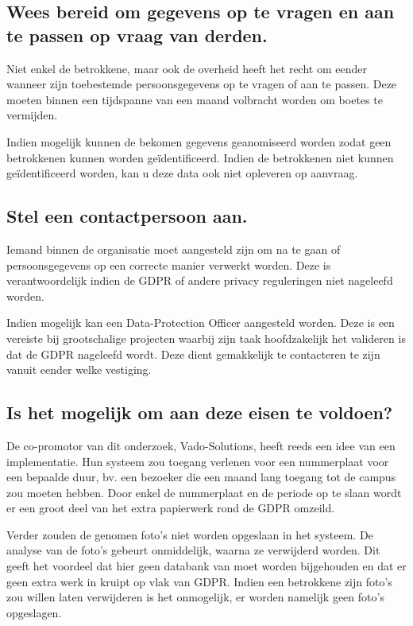 \subsection{Wees bereid om gegevens op te vragen en aan te passen op vraag van derden.}
Niet enkel de betrokkene, maar ook de overheid heeft het recht om eender wanneer zijn toebestemde persoonsgegevens op te vragen of aan te passen. Deze moeten binnen een tijdspanne van een maand volbracht worden om boetes te vermijden.

Indien mogelijk kunnen de bekomen gegevens geanomiseerd worden zodat geen betrokkenen kunnen worden geïdentificeerd. Indien de betrokkenen niet kunnen geïdentificeerd worden, kan u deze data ook niet opleveren op aanvraag.

\subsection{Stel een contactpersoon aan.}
Iemand binnen de organisatie moet aangesteld zijn om na te gaan of persoonsgegevens op een correcte manier verwerkt worden. Deze is verantwoordelijk indien de GDPR of andere privacy reguleringen niet nageleefd worden.

Indien mogelijk kan een Data-Protection Officer aangesteld worden. Deze is een vereiste bij grootschalige projecten waarbij zijn taak hoofdzakelijk het valideren is dat de GDPR nageleefd wordt. Deze dient gemakkelijk te contacteren te zijn vanuit eender welke vestiging.

\subsection{Is het mogelijk om aan deze eisen te voldoen?}
De co-promotor van dit onderzoek, Vado-Solutions, heeft reeds een idee van een implementatie. Hun systeem zou toegang verlenen voor een nummerplaat voor een bepaalde duur, bv. een bezoeker die een maand lang toegang tot de campus zou moeten hebben. Door enkel de nummerplaat en de periode op te slaan wordt er een groot deel van het extra papierwerk rond de GDPR omzeild.

Verder zouden de genomen foto's niet worden opgeslaan in het systeem. De analyse van de foto's gebeurt onmiddelijk, waarna ze verwijderd worden. Dit geeft het voordeel dat hier geen databank van moet worden bijgehouden en dat er geen extra werk in kruipt op vlak van GDPR. Indien een betrokkene zijn foto's zou willen laten verwijderen is het onmogelijk, er worden namelijk geen foto's opgeslagen.

